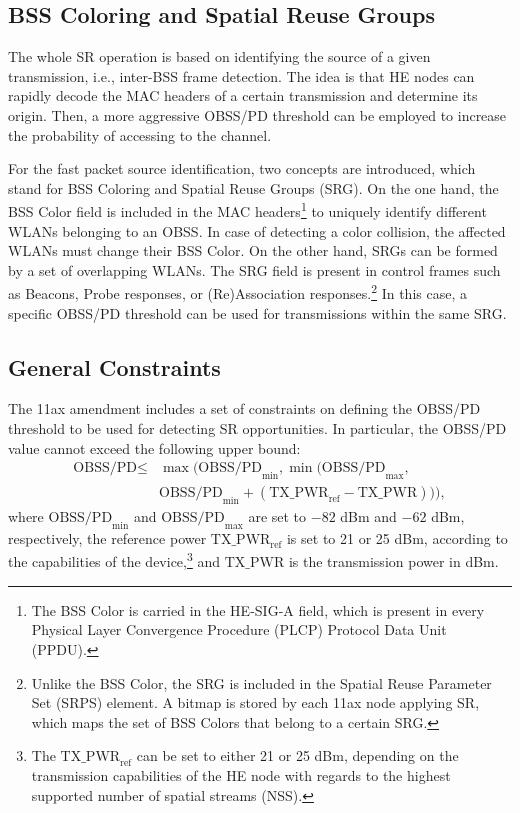\documentclass{article}
\begin{document}
	\subsection{BSS Coloring and Spatial Reuse Groups}
	
	The whole SR operation is based on identifying the source of a given transmission, i.e., inter-BSS frame detection. The idea is that HE nodes can rapidly decode the MAC headers of a certain transmission and determine its origin. Then, a more aggressive OBSS/PD threshold can be employed to increase the probability of accessing to the channel.
	
	For the fast packet source identification, two concepts are introduced, which stand for BSS Coloring and Spatial Reuse Groups (SRG). On the one hand, the BSS Color field is included in the MAC headers\footnote{The BSS Color is carried in the HE-SIG-A field, which is present in every Physical Layer Convergence Procedure (PLCP) Protocol Data Unit (PPDU).} to uniquely identify different WLANs belonging to an OBSS. In case of detecting a color collision, the affected WLANs must change their BSS Color. On the other hand, SRGs can be formed by a set of overlapping WLANs. The SRG field is present in control frames such as Beacons, Probe responses, or (Re)Association responses.\footnote{Unlike the BSS Color, the SRG is included in the Spatial Reuse Parameter Set (SRPS) element. A bitmap is stored by each 11ax node applying SR, which maps the set of BSS Colors that belong to a certain SRG.} In this case, a specific OBSS/PD threshold can be used for transmissions within the same SRG.
		
	\subsection{General Constraints}
	The 11ax amendment includes a set of constraints on defining the OBSS/PD threshold to be used for detecting SR opportunities. In particular, the OBSS/PD value cannot exceed the following upper bound:
	\begin{align}\nonumber \text{OBSS/PD} \leq & \max\Big(\text{OBSS/PD}_{\min}, \min\big(\text{OBSS/PD}_{\max},\\ & \text{OBSS/PD}_{\min} + (\text{TX\_PWR}_{\text{ref}}-\text{TX\_PWR})\big)\Big), \nonumber \end{align}
	where $\text{OBSS/PD}_{\min}$ and $\text{OBSS/PD}_{\max}$ are set to $-82$ dBm and $-62$ dBm, respectively, the reference power $\text{TX\_PWR}_{\text{ref}}$ is set to 21 or 25 dBm, according to the
	capabilities of the device,\footnote{The $\text{TX\_PWR}_{\text{ref}}$ can be set to either 21 or 25 dBm, depending on the transmission capabilities of the HE node with regards to the highest supported number of spatial streams (NSS).} and $\text{TX\_PWR}$ is the transmission power in dBm.
	
\end{document}

